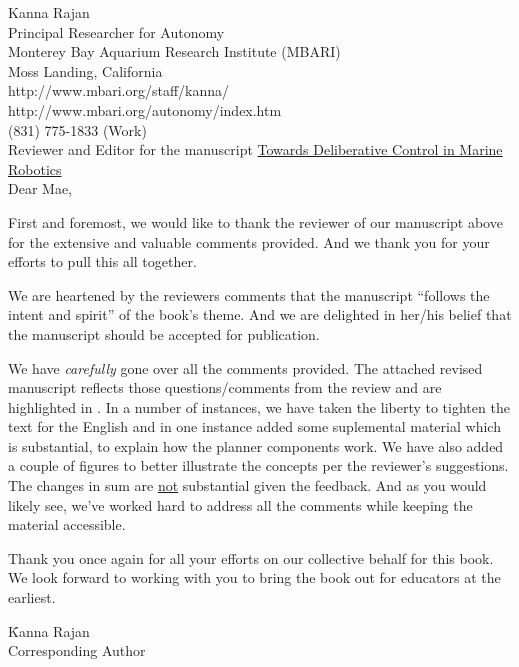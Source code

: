 \documentclass[11pt,twoside]{article}
\begin{document}
\thispagestyle{empty}
\pagestyle{empty}
\setlength{\parindent}{0pt} 
\setlength{\parskip}{2ex}


Kanna Rajan\\
Principal Researcher for Autonomy\\
Monterey Bay Aquarium Research Institute (MBARI)\\
Moss Landing, California\\
http://www.mbari.org/staff/kanna/\\
http://www.mbari.org/autonomy/index.htm \\
(831) 775-1833 (Work)\\

Reviewer and Editor for the manuscript \textsf{\underline{Towards Deliberative Control in Marine Robotics}}\\

Dear Mae,

First and foremost, we would like to thank the reviewer of our
manuscript above for the extensive and valuable comments provided. And
we thank you for your efforts to pull this all together.

We are heartened by the reviewers comments that the manuscript
``follows the intent and spirit'' of the book's theme. And we are
delighted in her/his belief that the manuscript should be accepted for
publication.

We have \emph{carefully} gone over all the comments provided. The
attached revised manuscript reflects those questions/comments from the
review and are highlighted in  . In a number of
instances, we have taken the liberty to tighten the text for the
English and in one instance added some suplemental material which is
substantial, to explain how the \eu planner components work. We have
also added a couple of figures to better illustrate the concepts per
the reviewer's suggestions. The changes in sum are \underline{not}
substantial given the feedback. And as you would likely see, we've
worked hard to address all the comments while keeping the material
accessible.

Thank you once again for all your efforts on our collective behalf for
this book. We look forward to working with you to bring the book out
for educators at the earliest.

\vspace{+2cm}
\begin{tabbing}
\hspace{+10cm}\=Kanna Rajan\\
\>Corresponding Author\\
\end{tabbing}
\end{document}
